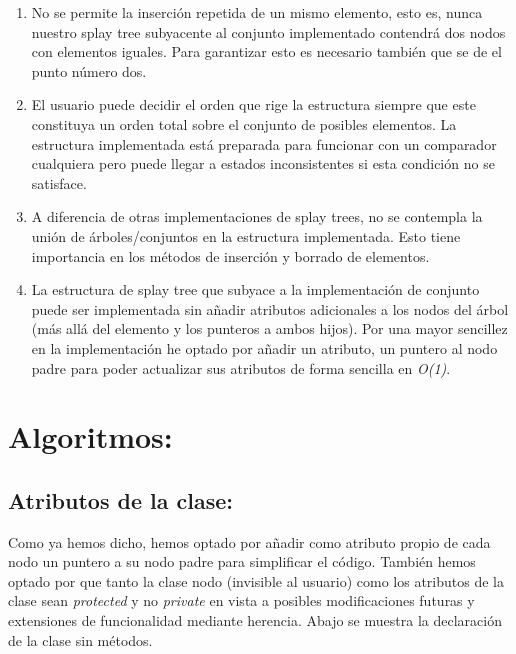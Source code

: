 \documentclass[letterpaper,12pt]{article}
\begin{document}
\begin{enumerate}
\setlength{\parskip}{0mm}         %

\item No se permite la inserción repetida de un mismo elemento, esto es, 
      nunca nuestro splay tree subyacente al conjunto implementado contendrá
      dos nodos con elementos iguales. Para garantizar esto es necesario 
      también que se de el punto número dos.
\item El usuario puede decidir el orden que rige la estructura siempre que 
      este constituya un orden total sobre el conjunto de posibles 
      elementos. La estructura implementada está preparada para funcionar con 
      un comparador cualquiera pero puede llegar a estados inconsistentes si 
      esta condición no se satisface.
\item A diferencia de otras implementaciones de splay trees, no se contempla
      la unión de árboles/conjuntos en la estructura implementada. Esto tiene
      importancia en los métodos de inserción y borrado de elementos.
\item La estructura de splay tree que subyace a la implementación de conjunto
      puede ser implementada sin añadir atributos adicionales a los nodos del
      árbol (más allá del elemento y los punteros a ambos hijos). Por una 
      mayor sencillez en la implementación he optado por añadir un atributo,
      un puntero al nodo padre para poder actualizar sus atributos de forma 
      sencilla en \textit{O(1)}.
     
\end{enumerate}

\section{Algoritmos:}
\subsection{Atributos de la clase:}

Como ya hemos dicho, hemos optado por añadir como atributo propio de cada nodo
un puntero a su nodo padre para simplificar el código. También hemos optado
por que tanto la clase nodo (invisible al usuario) como los atributos de la 
clase sean \textit{protected} y no \textit{private} en vista a posibles 
modificaciones futuras y extensiones de funcionalidad mediante herencia. Abajo
se muestra la declaración de la clase sin métodos.
\end{document}
